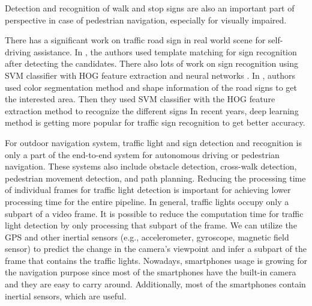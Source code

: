 Detection and recognition of walk and stop signs are also an important part of perspective in case of pedestrian navigation, especially for visually impaired.

There has a significant work on traffic road sign in real world scene for self-driving assistance.
In \cite{template}, the authors used template matching for sign recognition after detecting the candidates.
There also lots of work on sign recognition using SVM \cite{svm,svm2} classifier with HOG feature extraction \cite{tra_sign,svm_with_image} and neural networks \cite{nn_random}.
In \cite{svm_with_image}, authors used color segmentation method and shape information of the road signs to get the interested area.
Then they used SVM classifier with the HOG feature extraction method to recognize the different signs 
In recent years, deep learning method \cite{deep1,deep2,deep3} is getting more popular for traffic sign recognition to get better accuracy.



For outdoor navigation system, traffic light and sign detection and recognition is only a part of the end-to-end system for autonomous driving or pedestrian navigation.
These systems also include obstacle detection, cross-walk detection, pedestrian movement detection, and path planning.
Reducing the processing time of individual frames for traffic light detection is important for achieving lower processing time for the entire pipeline.
In general, traffic lights occupy only a subpart of a video frame.
It is possible to reduce the computation time for traffic light detection by only processing that subpart of the frame.
We can utilize the GPS and other inertial sensors (e.g., accelerometer, gyroscope, magnetic field sensor) \cite{sensor,sensor2,sensor3} to predict the change in the camera's viewpoint and infer a subpart of the frame that contains the traffic lights. 
Nowadays, smartphones usage is growing for the navigation purpose since most of the smartphones have the built-in camera and they are easy to carry around.
Additionally, most of the smartphones contain inertial sensors, which are useful.

